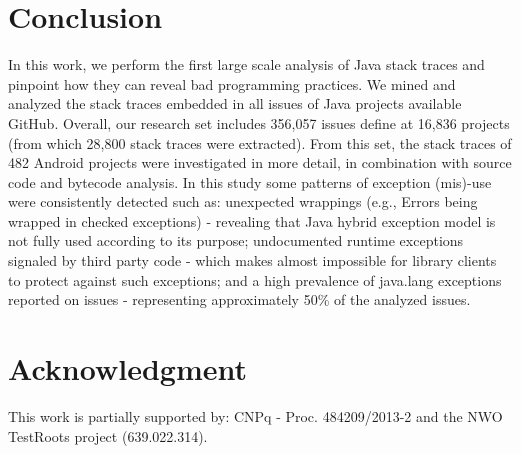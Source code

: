 \documentclass[conference]{IEEEtran}
\begin{document}
\section{Conclusion}

In this work, we perform the first large scale analysis of Java stack traces and
pinpoint how they can reveal bad programming practices. We mined and analyzed
the stack traces embedded in all issues of Java projects available GitHub.
Overall, our research set includes 356,057 issues define at 16,836 projects
(from which 28,800 stack traces were extracted). From this set, the stack traces
of 482 Android projects were investigated in more detail, in combination with
source code and bytecode analysis. In this study some patterns of exception
(mis)-use were consistently detected such as: unexpected wrappings (e.g., Errors
being wrapped in checked exceptions) - revealing that Java hybrid exception
model is not fully used according to its purpose;  undocumented runtime
exceptions signaled by third party code - which makes almost impossible for
library clients to protect against such exceptions; and a high prevalence of
java.lang exceptions reported on issues - representing approximately 50\% of the
analyzed issues.




\section*{Acknowledgment} This work is partially supported by: CNPq - Proc.
484209/2013-2 and the NWO TestRoots project (639.022.314).




\end{document}
